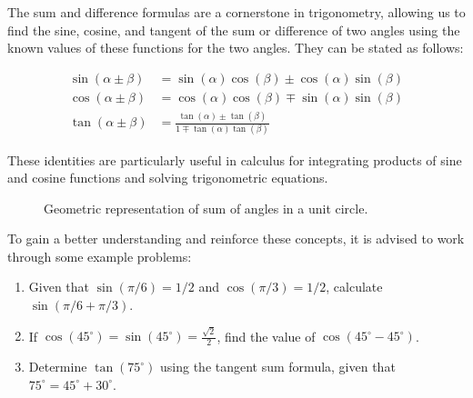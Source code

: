 \documentclass[a4paper,12pt]{book}
\newcounter{problem}
\begin{document}
The sum and difference formulas are a cornerstone in trigonometry, allowing us to find the sine, cosine, and tangent of the sum or difference of two angles using the known values of these functions for the two angles. They can be stated as follows:

\begin{align*}
\sin(\alpha \pm \beta) &= \sin(\alpha)\cos(\beta) \pm \cos(\alpha)\sin(\beta) \\
\cos(\alpha \pm \beta) &= \cos(\alpha)\cos(\beta) \mp \sin(\alpha)\sin(\beta) \\
\tan(\alpha \pm \beta) &= \frac{\tan(\alpha) \pm \tan(\beta)}{1 \mp \tan(\alpha)\tan(\beta)}
\end{align*}

These identities are particularly useful in calculus for integrating products of sine and cosine functions and solving trigonometric equations.

\begin{figure}[htbp]
\centering
{}
\caption{Geometric representation of sum of angles in a unit circle.}
\label{fig:sum_of_angles}
\end{figure}

To gain a better understanding and reinforce these concepts, it is advised to work through some example problems:

\begin{enumerate}
    \item Given that $\sin(\pi/6) = 1/2$ and $\cos(\pi/3) = 1/2$, calculate $\sin(\pi/6 + \pi/3)$.
    \item If $\cos(45^\circ) = \sin(45^\circ) = \frac{\sqrt{2}}{2}$, find the value of $\cos(45^\circ - 45^\circ)$.
    \item Determine $\tan(75^\circ)$ using the tangent sum formula, given that $75^\circ = 45^\circ + 30^\circ$.
\end{enumerate}
\end{document}
